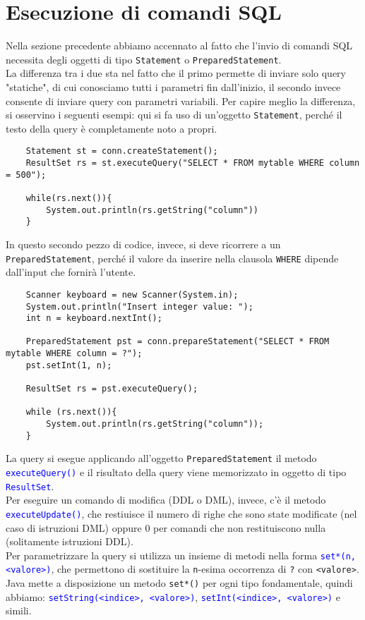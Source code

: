 \documentclass[12pt,a4paper]{book}
\begin{document}
	\section{Esecuzione di comandi SQL}
	Nella sezione precedente abbiamo accennato al fatto che l'invio di comandi SQL necessita degli oggetti di tipo \texttt{Statement} o \texttt{PreparedStatement}.\\
	La differenza tra i due sta nel fatto che il primo permette di inviare solo query "statiche", di cui conosciamo tutti i parametri fin dall'inizio, il secondo invece consente di inviare query con parametri variabili.
	Per capire meglio la differenza, si osservino i seguenti esempi: qui si fa uso di un'oggetto \texttt{Statement}, perché il testo della query è completamente noto a propri.
	\begin{lstlisting}
	Statement st = conn.createStatement();
	ResultSet rs = st.executeQuery("SELECT * FROM mytable WHERE column = 500");
	
	while(rs.next()){
		System.out.println(rs.getString("column"))
	}
	\end{lstlisting}
	In questo secondo pezzo di codice, invece, si deve ricorrere a un \texttt{PreparedStatement}, perché il valore da inserire nella clausola \texttt{WHERE} dipende dall'input che fornirà l'utente.
	\begin{lstlisting}
	Scanner keyboard = new Scanner(System.in);
	System.out.println("Insert integer value: ");
	int n = keyboard.nextInt();
	
	PreparedStatement pst = conn.prepareStatement("SELECT * FROM mytable WHERE column = ?");
	pst.setInt(1, n);
	
	ResultSet rs = pst.executeQuery();
	
	while (rs.next()){
		System.out.println(rs.getString("column"));
	}
	\end{lstlisting}
	La query si esegue applicando all'oggetto \texttt{PreparedStatement} il metodo \textcolor{blue}{\texttt{executeQuery()}} e il risultato della query viene memorizzato in oggetto di tipo \textcolor{blue}{\texttt{ResultSet}}.\\
	Per eseguire un comando di modifica (DDL o DML), invece, c'è il metodo \textcolor{blue}{\texttt{executeUpdate()}}, che restiuisce il numero di righe che sono state modificate (nel caso di istruzioni DML) oppure 0 per comandi che non restituiscono nulla (solitamente istruzioni DDL).\\
	Per parametrizzare la query si utilizza un insieme di metodi nella forma \textcolor{blue}{\texttt{set*(n, <valore>)}}, che permettono di sostituire la \texttt{n}-esima occorrenza di \texttt{?} con \texttt{<valore>}. \\Java mette a disposizione un metodo \texttt{set*()} per ogni tipo fondamentale, quindi abbiamo: \textcolor{blue}{\texttt{setString(<indice>, <valore>)}}, \textcolor{blue}{\texttt{setInt(<indice>, <valore>)}} e simili.
\end{document}
